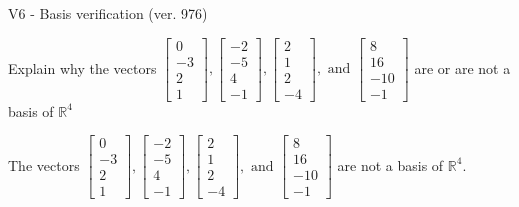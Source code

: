 \begin{exercise}
  \begin{exerciseTitle}V6 - Basis verification (ver. 976)\end{exerciseTitle}
  \begin{exerciseStatement}
    Explain why the vectors \(\left[\begin{array}{r}
0 \\
-3 \\
2 \\
1
\end{array}\right] , \left[\begin{array}{r}
-2 \\
-5 \\
4 \\
-1
\end{array}\right] , \left[\begin{array}{r}
2 \\
1 \\
2 \\
-4
\end{array}\right] , \text{ and } \left[\begin{array}{r}
8 \\
16 \\
-10 \\
-1
\end{array}\right]\) are or are not a basis of \(\mathbb{R}^4\)	


  \end{exerciseStatement}
  \begin{exerciseAnswer}
   The vectors \(\left[\begin{array}{r}
0 \\
-3 \\
2 \\
1
\end{array}\right] , \left[\begin{array}{r}
-2 \\
-5 \\
4 \\
-1
\end{array}\right] , \left[\begin{array}{r}
2 \\
1 \\
2 \\
-4
\end{array}\right] , \text{ and } \left[\begin{array}{r}
8 \\
16 \\
-10 \\
-1
\end{array}\right]\) 
  	 are not  a basis of \(\mathbb{R}^4\).
  


  \end{exerciseAnswer}
\end{exercise}